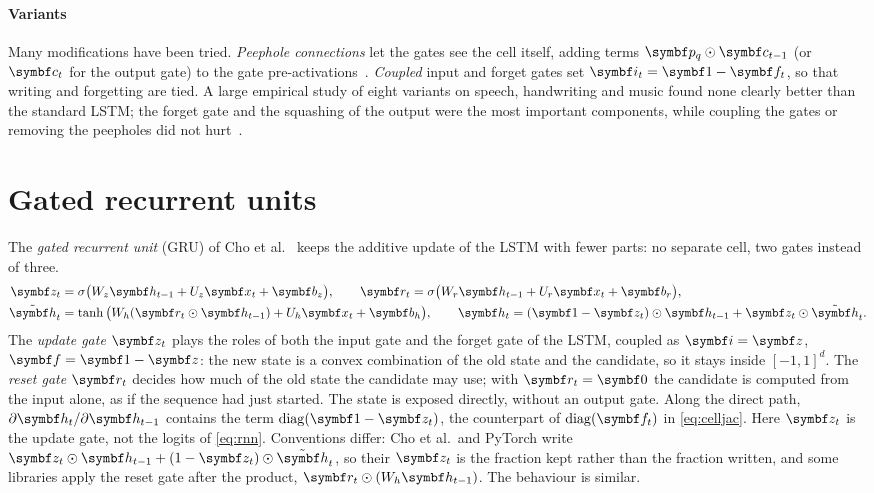 \documentclass[11pt]{article}
\newcommand{\hv}{\vect{h}}
\newcommand{\bv}{\vect{b}}
\newcommand{\cv}{\vect{c}}
\newcommand{\zv}{\vect{z}}
\newcommand{\iv}{\vect{i}}
\newcommand{\fv}{\vect{f}}
\newcommand{\rv}{\vect{r}}
\newcommand{\htil}{\tilde{\vect{h}}}
\newcommand{\diag}{\operatorname{diag}}
\begin{document}
\paragraph{Variants} Many modifications have been tried. \emph{Peephole connections} let the gates see the cell itself,
adding terms $\vect{p}_q \odot \cv_{t-1}$ (or $\cv_t$ for the output gate) to the gate pre-activations~\cite{gers2000peep}.
\emph{Coupled} input and forget gates set $\iv_t = \vect{1} - \fv_t$, so that writing and forgetting are tied. A large
empirical study of eight variants on speech, handwriting and music found none clearly better than the standard LSTM; the
forget gate and the squashing of the output were the most important components, while coupling the gates or removing
the peepholes did not hurt~\cite{greff2017}.

\section{Gated recurrent units}\label{sec:gru}

The \emph{gated recurrent unit} (GRU) of Cho et al.~\cite{cho2014} keeps the additive update of the LSTM with fewer
parts: no separate cell, two gates instead of three.
\begin{equation}\label{eq:gru}
\begin{aligned}
  \zv_t &= \sigma\big(W_z\hv_{t-1} + U_z\x_t + \bv_z\big), \qquad
  \rv_t = \sigma\big(W_r\hv_{t-1} + U_r\x_t + \bv_r\big), \\
  \htil_t &= \tanh\big(W_h(\rv_t \odot \hv_{t-1}) + U_h\x_t + \bv_h\big), \qquad
  \hv_t = (\vect{1} - \zv_t) \odot \hv_{t-1} + \zv_t \odot \htil_t .
\end{aligned}
\end{equation}
The \emph{update gate} $\zv_t$ plays the roles of both the input gate and the forget gate of the LSTM, coupled as
$\iv = \zv$, $\fv = \vect{1} - \zv$: the new state is a convex combination of the old state and the candidate, so it stays
inside $[-1, 1]^d$. The \emph{reset gate} $\rv_t$ decides how much of the old state the candidate may use; with
$\rv_t = \vect{0}$ the candidate is computed from the input alone, as if the sequence had just started. The state is
exposed directly, without an output gate. Along the direct path, $\partial\hv_t/\partial\hv_{t-1}$ contains the term $\diag(\vect{1} - \zv_t)$,
the counterpart of $\diag(\fv_t)$ in \eqref{eq:celljac}. Here $\zv_t$ is the update gate, not the logits of
\eqref{eq:rnn}. Conventions differ: Cho et al.\ and PyTorch write $\zv_t \odot \hv_{t-1} + (1 - \zv_t)\odot\htil_t$, so
their $\zv_t$ is the fraction kept rather than the fraction written, and some libraries apply the reset gate after the product, $\rv_t \odot
(W_h\hv_{t-1})$. The behaviour is similar.
\end{document}
